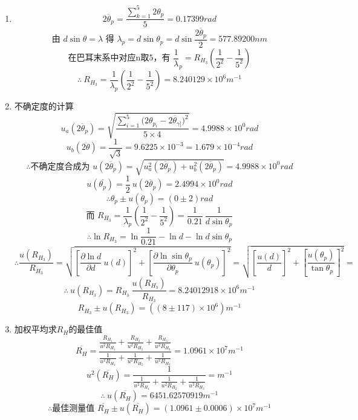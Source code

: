 \documentclass[11pt,a4paper,oneside]{article}
\begin{document}
\begin{enumerate}
  \item { }
      $$\overline{2{\theta}_p} = \displaystyle\frac{\sum_{k=1}^5 2{\theta}_p}{5} = 0.17399rad$$
      $$\displaystyle\text{由\ }d\sin{\theta} = {\lambda}\text{\ 得\ }{\lambda}_p = d\sin{\theta}_p = d\sin{\frac{\overline{2{\theta}_p}}{2}} = 577.89200nm$$
      $$\displaystyle\text{在巴耳末系中对应n取5，有\ }\frac{1}{\lambda}_p = R_{H_3}\left(\frac{1}{2^2}-\frac{1}{5^2}\right)$$
      $$\therefore\ \displaystyle R_{H_3} = \frac{1}{ {\lambda}_p}\left(\frac{1}{2^2}-\frac{1}{5^2}\right) = 8.240129{\times}10^{6}m^{-1}$$
  \item {不确定度的计算}
      $$u_a(\overline{2{\theta}_p}) = \displaystyle\sqrt{\frac{\sum_{i=1}^5{(2{\theta}_{p_{i}}-\overline{2{\theta}_{\gamma]}}})^2}{5\times4}}=4.9988{\times}10^{0} rad$$
      $$u_b(\overline{2\theta}) = \displaystyle\frac{1}{\sqrt3} = 9.6225\times10^{-3} = 1.679 \times 10^{-4} rad$$
      $$\therefore\text{不确定度合成为\ }u(\overline{2{\theta}_p}) = \sqrt{u_a^2(\overline{2{\theta}_p})+u_b^2(\overline{2{\theta}_p})} = 4.9988{\times}10^{0}rad$$
      $$u(\overline{ {\theta}_p})= \displaystyle\frac12\ u(\overline{2{\theta}_p}) = 2.4994{\times}10^{0}rad$$
      $$\therefore{\theta}_p \pm u({\theta}_p) = (0\pm2)rad$$
      $$\text{而\ }\displaystyle R_{H_3} = \frac{1}{ {\lambda}_p}\left(\frac{1}{2^2}-\frac{1}{5^2}\right) = \frac{1}{0.21}\ \frac{1}{d\sin{\theta}_p}$$
      $$\therefore\ln{R_{H_3}} = \ln{\frac{1}{0.21}} -\ln{d} - \ln{d\sin{\theta}_p}$$
      $$\therefore\displaystyle \frac{u(R_{H_3})}{R_{H_3}} = \sqrt{ {\left[\frac{\partial{\ln{d}}}{\partial{d}}\ u(d)\right]}^2 + {\left[\frac{\partial{\ln{\sin{ {\theta}_p}}}}{\partial{ {\theta}_p}}\ u({\theta}_p)\right]}^2} = \sqrt{ {\left[\frac{u(d)}{d}\right]}^2 + {\left[\frac{u({\theta}_p)}{\tan{ {\theta}_p}}\right]}^2} = $$
      $$\therefore \ u(R_{H_3}) = \displaystyle R_{H_3}\ \frac{u(R_{H_3})}{R_{H_3}} = 8.24012918{\times}10^{6}m^{-1}$$ 
      $$R_{H_3} \pm u(R_{H_3}) = ((8\pm117){\times}10^{6})m^{-1}$$
  \item{加权平均求$R_H$的最佳值}
      $$\overline{R_H} = \displaystyle\frac{\frac{R_{H_1}}{u^2{R_{H_1}}}+\frac{R_{H_2}}{u^2{R_{H_2}}}+\frac{R_{H_3}}{u^2{R_{H_3}}}}{\frac{1}{u^2{R_{H_1}}}+\frac{1}{u^2{R_{H_2}}}+\frac{1}{u^2{R_{H_3}}}} = 1.0961{\times}10^{7}m^{-1}$$
      $$u^2(\overline{R_H}) = \displaystyle\frac{1}{\frac{1}{u^2{R_{H_1}}}+\frac{1}{u^2{R_{H_2}}}+\frac{1}{u^2{R_{H_3}}}} = m^{-1}$$
      $$\therefore \ u(\overline{R_H}) = 6451.62570919m^{-1} $$
      $$\therefore\text{最佳测量值 \ } \overline{R_H} \pm u(\overline{R_H}) = (1.0961\pm0.0006){\times}10^{7} m^{-1}$$   
\end{enumerate}
\end{document}

